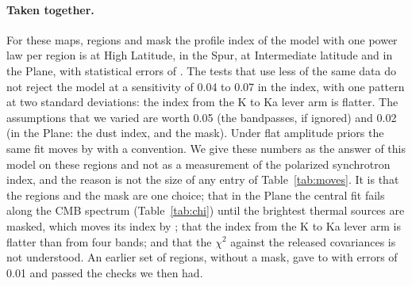 \paragraph{Taken together.} For these maps, regions and mask the profile index of the model with one
power law per region is  at High Latitude, in the Spur, at Intermediate latitude and in
the Plane, with statistical errors of . The tests that use less of the same data do not
reject the model at a sensitivity of 0.04 to 0.07 in the index, with one pattern at two standard
deviations: the index from the K to Ka lever arm is flatter. The assumptions that we varied are
worth 0.05 (the bandpasses, if ignored) and 0.02 (in the Plane: the dust index, and the mask). Under flat
amplitude priors the same fit moves by  with a convention. We give these numbers as
the answer of this model on these regions and not as a measurement of the polarized synchrotron
index, and the reason is not the size of any entry of Table~\ref{tab:moves}. It is that the regions
and the mask are one choice; that in the Plane the central fit fails along the CMB spectrum
(Table~\ref{tab:chi}) until the brightest thermal sources are masked, which moves its index by
; that the index from the K to Ka lever arm is flatter than from four bands; and
that the $\chi^2$ against the released covariances is not understood. An earlier set of regions, without a mask, gave  to
 with errors of 0.01 and passed the checks we then had.
